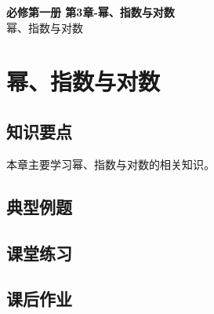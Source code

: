 \documentclass[12pt,a4paper]{article}
\begin{document}
\begin{center}
\LARGE\textbf{必修第一册 第3章-幂、指数与对数} \\[0.5em]
\large 幂、指数与对数
\end{center}

\tableofcontents
\newpage

\section{幂、指数与对数}

\subsection{知识要点}
本章主要学习幂、指数与对数的相关知识。

\subsection{典型例题}

\subsection{课堂练习}

\subsection{课后作业}
\end{document}
